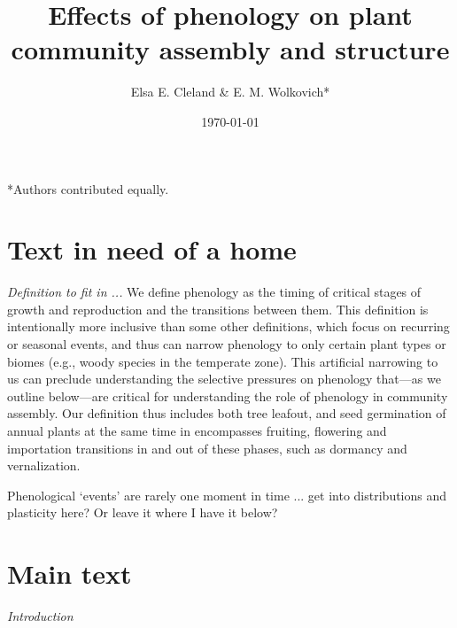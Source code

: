 \documentclass[11pt]{article}
\begin{document}

\renewcommand{\refname}{\CHead{}}

\title{Effects of phenology on plant community assembly and structure }
\author{Elsa E. Cleland \& E. M. Wolkovich*}
\date{\today}
\maketitle
\tableofcontents


\setlength{\parindent}{0cm}
\setlength{\parskip}{5pt}
*Authors contributed equally.




\section{Text in need of a home}

\emph{Definition to fit in ...} 
We define phenology as the timing of critical stages of growth and reproduction and the transitions between them. This definition is intentionally more inclusive than some other definitions, which focus on recurring or seasonal events, and thus can narrow phenology to only certain plant types or biomes (e.g., woody species in the temperate zone). This artificial narrowing to us can preclude understanding the selective pressures on phenology that---as we outline below---are critical for understanding the role of phenology in community assembly. Our definition thus includes both tree leafout, and seed germination of annual plants at the same time in encompasses fruiting, flowering and importation transitions in and out of these phases, such as dormancy and vernalization.

Phenological `events' are rarely one moment in time ... get into distributions and plasticity here? Or leave it where I have it below?

\section{Main text}

\emph{Introduction} 
\end{document}
